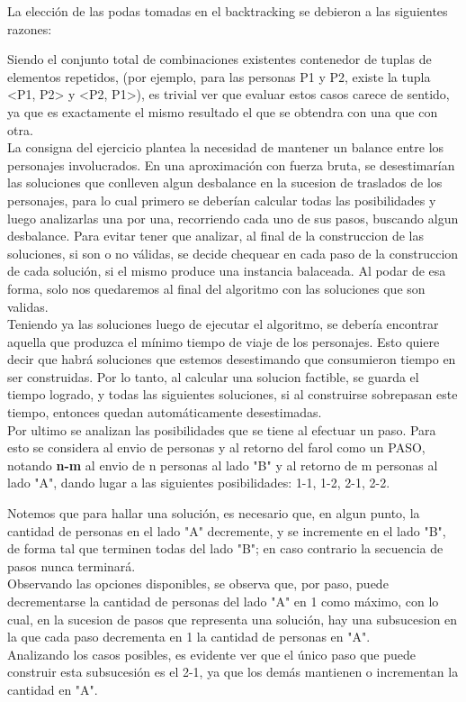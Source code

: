 La elección de las podas tomadas en el backtracking se debieron a las siguientes razones:

Siendo el conjunto total de combinaciones existentes contenedor de tuplas de elementos repetidos, (por ejemplo, para las personas P1 y P2, existe la tupla <P1, P2> y <P2, P1>), es trivial ver que evaluar estos casos carece de sentido, ya que es exactamente el mismo resultado el que se obtendra con una que con otra.\\

La consigna del ejercicio plantea la necesidad de mantener un balance entre los personajes involucrados. En una aproximación con fuerza bruta, se desestimarían las soluciones que conlleven algun desbalance en la sucesion de traslados de los personajes, para lo cual primero se deberían calcular todas las posibilidades y luego analizarlas una por una, recorriendo cada uno de sus pasos, buscando algun desbalance. Para evitar tener que analizar, al final de la construccion de las soluciones, si son o no válidas, se decide chequear en cada paso de la construccion de cada solución, si el mismo produce una instancia balaceada. Al podar de esa forma, solo nos quedaremos al final del algoritmo con las soluciones que son validas.\\

Teniendo ya las soluciones luego de ejecutar el algoritmo, se debería encontrar aquella que produzca el mínimo tiempo de viaje de los personajes. Esto quiere decir que habrá soluciones que estemos desestimando que consumieron tiempo en ser construidas. 
Por lo tanto, al calcular una solucion factible, se guarda el tiempo logrado, y todas las siguientes soluciones, si al construirse sobrepasan este tiempo, entonces quedan automáticamente desestimadas.\\

Por ultimo se analizan las posibilidades que se tiene al efectuar un paso. Para esto se considera al envio de personas y al retorno del farol como un PASO, notando \textbf{n-m} al envio de n personas al lado "B" y al retorno de m personas al lado "A", dando lugar a las siguientes posibilidades: {1-1, 1-2, 2-1, 2-2}.

Notemos que para hallar una solución, es necesario que, en algun punto, la cantidad de personas en el lado "A" decremente, y se incremente en el lado "B", de forma tal que terminen todas del lado "B"; en caso contrario la secuencia de pasos nunca terminará.\\ Observando las opciones disponibles, se observa que, por paso, puede decrementarse la cantidad de personas del lado "A" en 1 como máximo, con lo cual, en la sucesion de pasos que representa una solución, hay una subsucesion en la que cada paso decrementa en 1 la cantidad de personas en "A".\\ Analizando los casos posibles, es evidente ver que el único paso que puede construir esta subsucesión es el 2-1, ya que los demás mantienen o incrementan la cantidad en "A".\\\\

